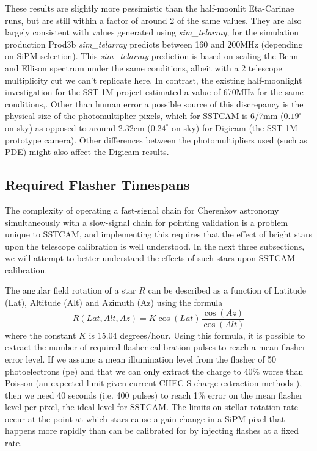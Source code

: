 These results are slightly more pessimistic than the half-moonlit Eta-Carinae runs, but are still within a factor of around 2 of the same values. They are also largely consistent with values generated using \textit{sim\_telarray}; for the simulation production Prod3b \textit{sim\_telarray} predicts between 160 and 200MHz (depending on SiPM selection). This \textit{sim\_telarray} prediction is based on scaling the Benn and Ellison spectrum under the same conditions, albeit with a 2 telescope multiplicity cut we can't replicate here. In contrast, the existing half-moonlight investigation for the SST-1M project \cite{1mcalib} estimated a value of 670MHz for the same conditions,. Other than human error a possible source of this discrepancy is the physical size of the photomultiplier pixels, which for SSTCAM is 6/7mm ($0.19^{\circ}$ on sky) as opposed to around 2.32cm ($0.24^{\circ}$ on sky) for Digicam (the SST-1M prototype camera). Other differences between the photomultipliers used (such as PDE) might also affect the Digicam results. 

\subsection{Required Flasher Timespans}

The complexity of operating a fast-signal chain for Cherenkov astronomy simultaneously with a slow-signal chain for pointing validation is a problem unique to SSTCAM, and implementing this requires that the effect of bright stars upon the telescope calibration is well understood. In the next three subsections, we will attempt to better understand the effects of such stars upon SSTCAM calibration.

The angular field rotation of a star $R$ can be described as a function of Latitude (Lat), Altitude (Alt) and Azimuth (Az) using the formula
\begin{equation}
    R(Lat,Alt,Az)=K\cos(Lat)\frac{\cos(Az)}{\cos(Alt)}
    \label{eq:rot}
\end{equation}
where the constant $K$ is 15.04 degrees/hour. Using this formula, it is possible to extract the number of required flasher calibration pulses to reach a mean flasher error level. If we assume a mean illumination level from the flasher of 50 photoelectrons (pe) and that we can only extract the charge to 40\% worse than Poisson (an expected limit given current CHEC-S charge extraction methods \cite{jasonthesis}), then we need 40 seconds (i.e. 400 pulses) to reach 1\% error on the mean flasher level per pixel, the ideal level for SSTCAM. The limits on stellar rotation rate occur at the point at which stars cause a gain change in a SiPM pixel that happens more rapidly than can be calibrated for by injecting flashes at a fixed rate.

